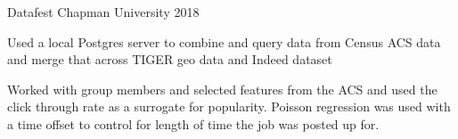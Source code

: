 \begin{cventries}
    
    
    
    {Datafest}
    {Chapman University}
    {2018}
    {
    \begin{cvitems} %
        \item {Used a local Postgres server to combine and query data from Census ACS data and merge that across TIGER geo data and Indeed dataset}
        \item{Worked with group members and selected features from the ACS and used the click through rate as a surrogate for popularity. Poisson regression was used with a time offset to control for length of time the job was posted up for.}
      \end{cvitems}
    }
    
\end{cventries}
